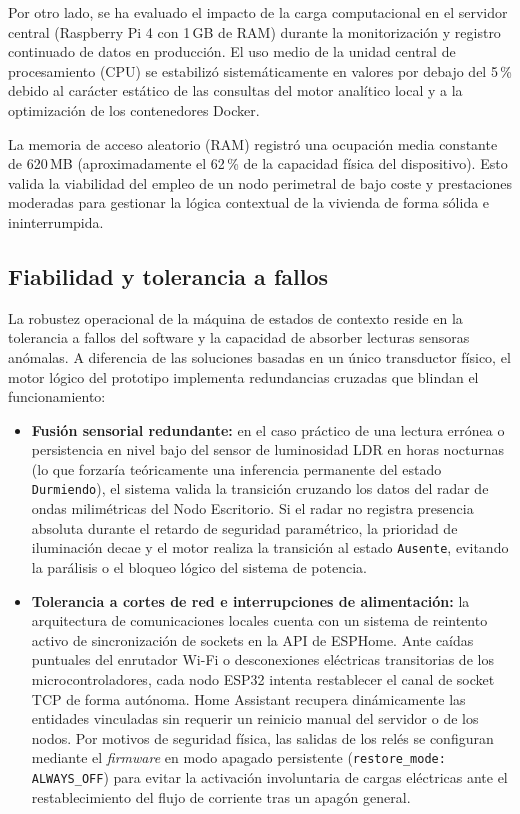 Por otro lado, se ha evaluado el impacto de la carga computacional en el servidor central (Raspberry Pi 4 con 1\,GB de RAM) durante la monitorización y registro continuado de datos en producción. El uso medio de la unidad central de procesamiento (CPU) se estabilizó sistemáticamente en valores por debajo del 5\,\% debido al carácter estático de las consultas del motor analítico local y a la optimización de los contenedores Docker. 

La memoria de acceso aleatorio (RAM) registró una ocupación media constante de 620\,MB (aproximadamente el 62\,\% de la capacidad física del dispositivo). Esto valida la viabilidad del empleo de un nodo perimetral de bajo coste y prestaciones moderadas para gestionar la lógica contextual de la vivienda de forma sólida e ininterrumpida.

\subsection{Fiabilidad y tolerancia a fallos}
\label{sec:fiabilidad_fallos}
La robustez operacional de la máquina de estados de contexto reside en la tolerancia a fallos del software y la capacidad de absorber lecturas sensoras anómalas. A diferencia de las soluciones basadas en un único transductor físico, el motor lógico del prototipo implementa redundancias cruzadas que blindan el funcionamiento:

\begin{itemize}
    \item \textbf{Fusión sensorial redundante:} en el caso práctico de una lectura errónea o persistencia en nivel bajo del sensor de luminosidad LDR en horas nocturnas (lo que forzaría teóricamente una inferencia permanente del estado \texttt{Durmiendo}), el sistema valida la transición cruzando los datos del radar de ondas milimétricas del Nodo Escritorio. Si el radar no registra presencia absoluta durante el retardo de seguridad paramétrico, la prioridad de iluminación decae y el motor realiza la transición al estado \texttt{Ausente}, evitando la parálisis o el bloqueo lógico del sistema de potencia.
    \item \textbf{Tolerancia a cortes de red e interrupciones de alimentación:} la arquitectura de comunicaciones locales cuenta con un sistema de reintento activo de sincronización de sockets en la API de ESPHome. Ante caídas puntuales del enrutador Wi-Fi o desconexiones eléctricas transitorias de los microcontroladores, cada nodo ESP32 intenta restablecer el canal de socket TCP de forma autónoma. Home Assistant recupera dinámicamente las entidades vinculadas sin requerir un reinicio manual del servidor o de los nodos. Por motivos de seguridad física, las salidas de los relés se configuran mediante el \textit{firmware} en modo apagado persistente (\texttt{restore\_mode: ALWAYS\_OFF}) para evitar la activación involuntaria de cargas eléctricas ante el restablecimiento del flujo de corriente tras un apagón general.
\end{itemize}

